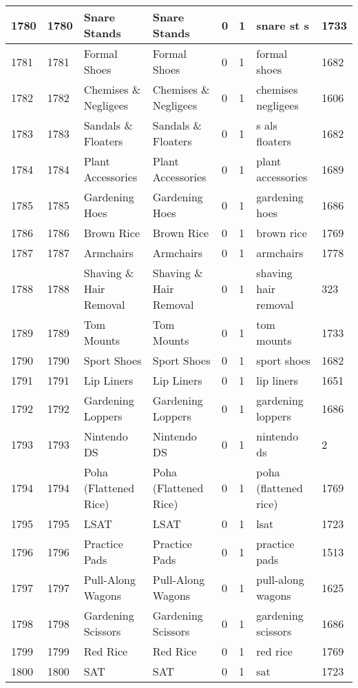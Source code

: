 \begin{longtable}{|l|l|l|l|l|l|l|l|}
1780 & 1780 & Snare Stands & Snare Stands & 0 & 1 & snare st s & 1733 \\ \hline 
1781 & 1781 & Formal Shoes & Formal Shoes & 0 & 1 & formal shoes & 1682 \\ \hline 
1782 & 1782 & Chemises \& Negligees & Chemises \& Negligees & 0 & 1 & chemises negligees & 1606 \\ \hline 
1783 & 1783 & Sandals \& Floaters & Sandals \& Floaters & 0 & 1 & s als floaters & 1682 \\ \hline 
1784 & 1784 & Plant Accessories & Plant Accessories & 0 & 1 & plant accessories & 1689 \\ \hline 
1785 & 1785 & Gardening Hoes & Gardening Hoes & 0 & 1 & gardening hoes & 1686 \\ \hline 
1786 & 1786 & Brown Rice & Brown Rice & 0 & 1 & brown rice & 1769 \\ \hline 
1787 & 1787 & Armchairs & Armchairs & 0 & 1 & armchairs & 1778 \\ \hline 
1788 & 1788 & Shaving \& Hair Removal & Shaving \& Hair Removal & 0 & 1 & shaving hair removal & 323 \\ \hline 
1789 & 1789 & Tom Mounts & Tom Mounts & 0 & 1 & tom mounts & 1733 \\ \hline 
1790 & 1790 & Sport Shoes & Sport Shoes & 0 & 1 & sport shoes & 1682 \\ \hline 
1791 & 1791 & Lip Liners & Lip Liners & 0 & 1 & lip liners & 1651 \\ \hline 
1792 & 1792 & Gardening Loppers & Gardening Loppers & 0 & 1 & gardening loppers & 1686 \\ \hline 
1793 & 1793 & Nintendo DS & Nintendo DS & 0 & 1 & nintendo ds & 2 \\ \hline 
1794 & 1794 & Poha (Flattened Rice) & Poha (Flattened Rice) & 0 & 1 & poha (flattened rice) & 1769 \\ \hline 
1795 & 1795 & LSAT & LSAT & 0 & 1 & lsat & 1723 \\ \hline 
1796 & 1796 & Practice Pads & Practice Pads & 0 & 1 & practice pads & 1513 \\ \hline 
1797 & 1797 & Pull-Along Wagons & Pull-Along Wagons & 0 & 1 & pull-along wagons & 1625 \\ \hline 
1798 & 1798 & Gardening Scissors & Gardening Scissors & 0 & 1 & gardening scissors & 1686 \\ \hline 
1799 & 1799 & Red Rice & Red Rice & 0 & 1 & red rice & 1769 \\ \hline 
1800 & 1800 & SAT & SAT & 0 & 1 & sat & 1723 \\ \hline 

\end{longtable}
